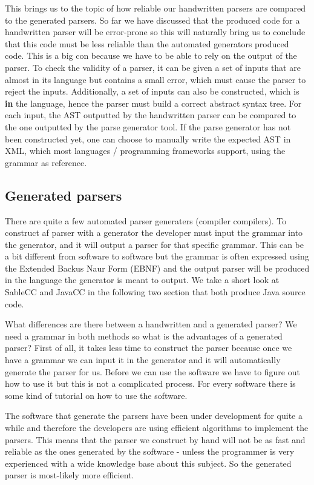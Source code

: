 This brings us to the topic of how reliable our handwritten parsers are compared to the generated parsers. So far we have discussed that the produced code for a handwritten parser will be error-prone so this will naturally bring us to conclude that this code must be less reliable than the automated generators produced code. This is a big con because we have to be able to rely on the output of the parser. To check the validity of a parser, it can be given a set of inputs that are almost in its language but contains a small error, which must cause the parser to reject the inputs. Additionally, a set of inputs can also be constructed, which is \textbf{in} the language, hence the parser must build a correct abstract syntax tree. For each input, the AST outputted by the handwritten parser can be compared to the one outputted by the parse generator tool. If the parse generator has not been constructed yet, one can choose to manually write the expected AST in XML, which most languages / programming frameworks support, using the grammar as reference.

\subsection{Generated parsers}
\label{sec:ana-genparser}
There are quite a few automated parser generaters (compiler compilers). To construct af parser with a generator the developer must input the grammar into the generator, and it will output a parser for that specific grammar. This can be a bit different from software to software but the grammar is often expressed using the Extended Backus Naur Form (EBNF) and the output parser will be produced in the language the generator is meant to output. We take a short look at SableCC and JavaCC in the following two section that both produce Java source code.

What differences are there between a handwritten and a generated parser? We need a grammar in both methods so what is the advantages of a generated parser? First of all, it takes less time to construct the parser because once we have a grammar we can input it in the generator and it will automatically generate the parser for us. Before we can use the software we have to figure out how to use it but this is not a complicated process. For every software there is some kind of tutorial on how to use the software.

The software that generate the parsers have been under development for quite a while and therefore the developers are using efficient algorithms to implement the parsers. This means that the parser we construct by hand will not be as fast and reliable as the ones generated by the software - unless the programmer is very experienced with a wide knowledge base about this subject. So the generated parser is most-likely more efficient.

